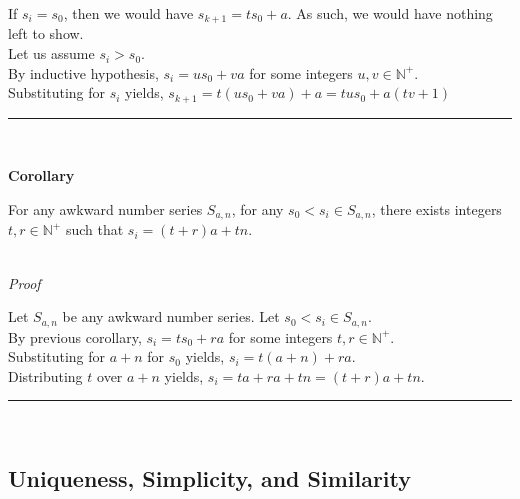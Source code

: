 \documentclass[a4paper,12pt]{article}
\begin{document}
\noindent If $s_i = s_0$, then we would have $s_{k+1} = ts_0 + a$. As such, we would have nothing left to show.\\

\noindent Let us assume $s_i > s_0$.\\

\noindent By inductive hypothesis, $s_i = us_0 + va$ for some integers $u, v \in \mathbb{N}^+$.\\

\noindent Substituting for $s_i$ yields, $s_{k + 1} = t(us_0 + va) + a = tus_0 + a(tv + 1)$


\begin{center}
\noindent\rule{8cm}{0.4pt}
\end{center}
\noindent \\








\label{corollary:relation_to_initial_p2}
\hypertarget{corollary:relation_to_initial_p2}{}
\begin{tcolorbox}
\textbf{Corollary}

For any awkward number series $S_{a,n}$, for any $s_0 < s_i \in S_{a,n}$, there exists integers $t, r \in \mathbb{N}^+$ such that $s_i = (t + r)a + tn$.

\end{tcolorbox}


\noindent \\
\textit{Proof}

\noindent Let $S_{a,n}$ be any awkward number series. Let $s_0 < s_i \in S_{a, n}$.\\

\noindent By previous corollary, $s_i = ts_0 + ra$ for some integers $t, r \in \mathbb{N}^+$.\\

\noindent Substituting for $a + n$ for $s_0$ yields, $s_i = t(a + n) + ra$.\\

\noindent Distributing $t$ over $a + n$ yields, $s_i = ta + ra + tn = (t + r)a + tn$.

\begin{center}
\noindent\rule{8cm}{0.4pt}
\end{center}
\noindent \\





\subsection{Uniqueness, Simplicity, and Similarity}
\end{document}
